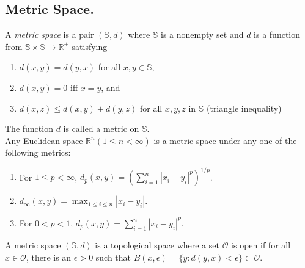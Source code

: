\documentclass[11pt]{article}
\theoremstyle{definition}
\begin{document}
\subsection{Metric Space.}
\label{subsec:measures:metric-space} A \emph{metric space} is a pair $(\mathbb{S},d)$ where $\mathbb{S}$ is a nonempty set and $d$ is a function from $\mathbb{S} \times \mathbb{S} \to \mathbb{R}^+$ satisfying 
\begin{enumerate}[label=(\roman*), itemsep=0.5em, topsep=0.5em]
    \item $d(x,y) = d(y,x)$ for all $x, y \in \mathbb{S}$,
    \item $d(x,y) = 0$ iff $x=y$, and
    \item $d(x,z) \le d(x,y) + d(y,z)$ for all $x,y,z$ in $\mathbb{S}$ (triangle inequality)
\end{enumerate}
The function $d$ is called a metric on $\mathbb{S}$. 
\\
Any Euclidean space $\mathbb{R}^n (1 \le n < \infty)$ is a metric space under any one of the following metrics:
\\
\begin{enumerate}[label=(\alph*), itemsep=1.5em, topsep=0.5em]
    \item For $1 \le p < \infty$, $d_p(x,y) = \left( \sum_{i=1}^n |x_i - y_i|^p \right)^{1/p}$.

    \item $d_\infty(x,y) = \max_{1 \le i \le n} |x_i - y_i|$.

    \item For $0 < p < 1$, $d_p(x,y) = \sum_{i=1}^n |x_i - y_i|^p$.
\end{enumerate}
A metric space $(\mathbb{S},d)$ is a topological space where a set $\mathcal{O}$ is open if for all $x \in \mathcal{O}$, there is an $\epsilon > 0$ such that $B(x,\epsilon) = \{y : d(y,x) < \epsilon\} \subset \mathcal{O}$.
\\
\end{document}
